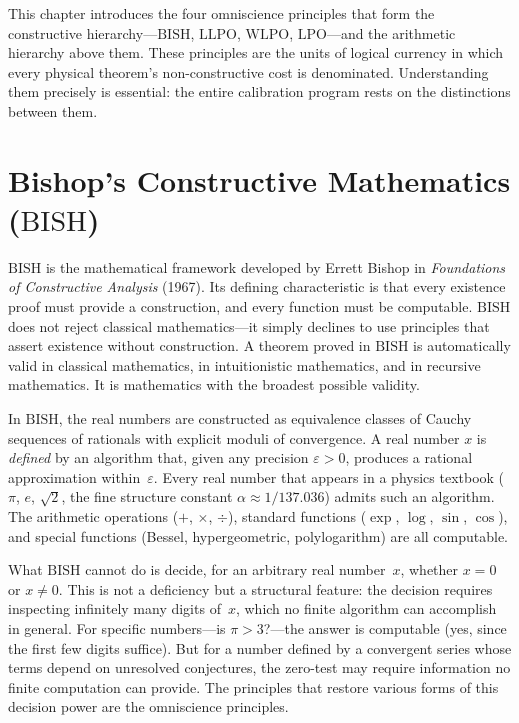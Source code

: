 \documentclass[11pt,a4paper]{report}
\theoremstyle{plain}
\theoremstyle{definition}
\theoremstyle{remark}
\newcommand{\BISH}{\mathrm{BISH}}
\newcommand{\LLPO}{\mathrm{LLPO}}
\newcommand{\WLPO}{\mathrm{WLPO}}
\newcommand{\LPO}{\mathrm{LPO}}
\begin{document}
This chapter introduces the four omniscience principles that form the constructive hierarchy---$\BISH$, $\LLPO$, $\WLPO$, $\LPO$---and the arithmetic hierarchy above them. These principles are the units of logical currency in which every physical theorem's non-constructive cost is denominated. Understanding them precisely is essential: the entire calibration program rests on the distinctions between them.

\section{Bishop's Constructive Mathematics ($\BISH$)}

$\BISH$ is the mathematical framework developed by Errett Bishop in \emph{Foundations of Constructive Analysis} (1967). Its defining characteristic is that every existence proof must provide a construction, and every function must be computable. $\BISH$ does not reject classical mathematics---it simply declines to use principles that assert existence without construction. A theorem proved in $\BISH$ is automatically valid in classical mathematics, in intuitionistic mathematics, and in recursive mathematics. It is mathematics with the broadest possible validity.

In $\BISH$, the real numbers are constructed as equivalence classes of Cauchy sequences of rationals with explicit moduli of convergence. A real number $x$ is \emph{defined} by an algorithm that, given any precision $\varepsilon > 0$, produces a rational approximation within~$\varepsilon$. Every real number that appears in a physics textbook ($\pi$, $e$, $\sqrt{2}$, the fine structure constant $\alpha \approx 1/137.036$) admits such an algorithm. The arithmetic operations ($+$, $\times$, $\div$), standard functions ($\exp$, $\log$, $\sin$, $\cos$), and special functions (Bessel, hypergeometric, polylogarithm) are all computable.

What $\BISH$ cannot do is decide, for an arbitrary real number~$x$, whether $x = 0$ or $x \neq 0$. This is not a deficiency but a structural feature: the decision requires inspecting infinitely many digits of~$x$, which no finite algorithm can accomplish in general. For specific numbers---is $\pi > 3$?---the answer is computable (yes, since the first few digits suffice). But for a number defined by a convergent series whose terms depend on unresolved conjectures, the zero-test may require information no finite computation can provide. The principles that restore various forms of this decision power are the omniscience principles.
\end{document}

